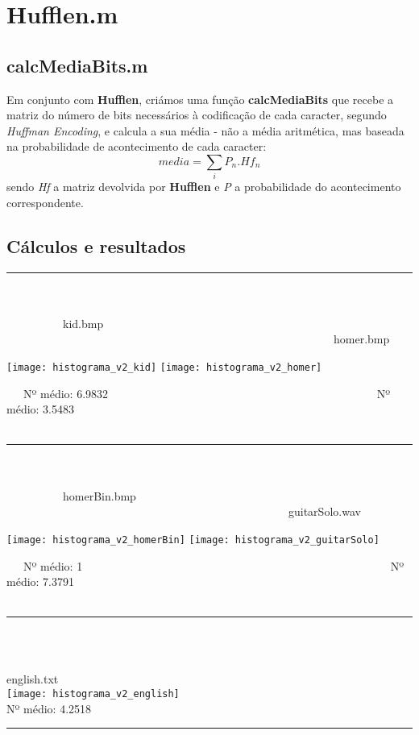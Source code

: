 \documentclass{article}
\begin{document}
\section{Hufflen.m}

\subsection{calcMediaBits.m}
Em conjunto com \textbf{Hufflen}, criámos uma função \textbf{calcMediaBits} que recebe a matriz do número de bits necessários à codificação de cada caracter, segundo \textit{Huffman Encoding}, e calcula a sua média - não a média aritmética, mas baseada na probabilidade de acontecimento de cada caracter:
\[
	media = \sum_i P_n . Hf_n
\]
 sendo \textit{Hf} a matriz devolvida por \textbf{Hufflen} e \textit{P} a probabilidade do acontecimento correspondente.

\newpage

\subsection{Cálculos e resultados}

\rule{12.5cm}{0.4pt}\\\\
\ \ \ \ \ \ \ \ \ \ kid.bmp  \ \ \ \ \ \ \ \ \ \ \ \ \ \ \ \ \ \ \ \ \ \ \ \ \ \ \ \ \ \ \ \ \ \ \ \ \ \ \ \ \ \ \ \ \ \ \ \ \ \ \ \ \ \ \ \ \ \  homer.bmp\\
\centerline{\texttt{[image: histograma\_v2\_kid]} \texttt{[image: histograma\_v2\_homer]}}
\ \ \ Nº médio: 6.9832  \ \ \ \ \ \ \ \ \ \ \ \ \ \ \ \ \ \ \ \ \ \ \ \ \ \ \ \ \ \ \ \ \ \ \ \ \ \ \ \ \ \ \ \ \ \ \  Nº médio: 3.5483\\\\
\rule{12.5cm}{0.4pt}\\\\
\ \ \ \ \ \ \ \ \ \ homerBin.bmp  \ \ \ \ \ \ \ \ \ \ \ \ \ \ \ \ \ \ \ \ \ \ \ \ \ \ \ \ \ \ \ \ \ \ \ \ \ \ \ \ \ \ \ \ \ \ \ \ \ \  guitarSolo.wav\\
\centerline{\texttt{[image: histograma\_v2\_homerBin]} \texttt{[image: histograma\_v2\_guitarSolo]}}
\ \ \ Nº médio: 1  \ \ \ \ \ \ \ \ \ \ \ \ \ \ \ \ \ \ \ \ \ \ \ \ \ \ \ \ \ \ \ \ \ \ \ \ \ \ \ \ \ \ \ \ \ \ \ \ \ \ \ \ \ \  Nº médio: 7.3791\\\\
\rule{12.5cm}{0.4pt}\\\\
\newpage
\begin{center}
english.txt\\
\texttt{[image: histograma\_v2\_english]}\\
Nº médio: 4.2518
\end{center}
\rule{12.5cm}{0.4pt}\\\\
\end{document}
